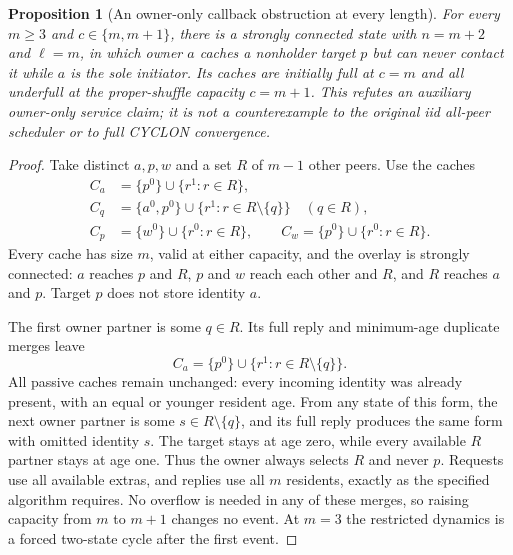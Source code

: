 \documentclass[11pt]{article}
\newtheorem{proposition}[theorem]{Proposition}
\begin{document}
\begin{proposition}[An owner-only callback obstruction at every length]
\label{prop:owneronlyobstruction}
For every $m\ge3$ and $c\in\{m,m+1\}$, there is a strongly
connected state with $n=m+2$ and $\ell=m$,
in which owner $a$ caches a nonholder target $p$ but
can never contact it while $a$ is the sole initiator.
Its caches are initially full at $c=m$ and all underfull
at the proper-shuffle capacity $c=m+1$.
This refutes an auxiliary owner-only service claim;
it is not a counterexample to the original iid
all-peer scheduler or to full CYCLON convergence.
\end{proposition}
\begin{proof}
Take distinct $a,p,w$ and a set $R$ of $m-1$ other
peers. Use the caches
\[
 \begin{split}
 C_a&=\{p^0\}\cup\{r^1:r\in R\},\\
 C_q&=\{a^0,p^0\}\cup\{r^1:r\in R\setminus\{q\}\}
                    \quad(q\in R),\\
 C_p&=\{w^0\}\cup\{r^0:r\in R\},\qquad
 C_w=\{p^0\}\cup\{r^0:r\in R\}.
 \end{split}
\]
Every cache has size $m$, valid at either capacity,
and the overlay is strongly
connected: $a$ reaches $p$ and $R$, $p$ and $w$ reach
each other and $R$, and $R$ reaches $a$ and $p$.
Target $p$ does not store identity $a$.

The first owner partner is some $q\in R$. Its full
reply and minimum-age duplicate merges leave
\[
 C_a=\{p^0\}\cup\{r^1:r\in R\setminus\{q\}\}.
\]
All passive caches remain unchanged: every incoming
identity was already present, with an equal or younger
resident age. From any state of this form, the next
owner partner is some $s\in R\setminus\{q\}$,
and its full reply produces the same form with omitted
identity $s$. The target stays at age zero, while
every available $R$ partner stays at age one. Thus
the owner always selects $R$ and never $p$.
Requests use all available extras, and replies use
all $m$ residents, exactly as the specified algorithm
requires. No overflow is needed in any of these merges,
so raising capacity from $m$ to $m+1$ changes no event.
At $m=3$ the restricted dynamics is a
forced two-state cycle after the first event.
\end{proof}
\end{document}

